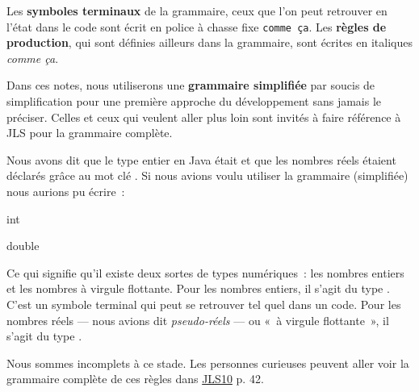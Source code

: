 Les \textbf{symboles terminaux} de la grammaire, ceux que l'on peut retrouver en
l'état dans le code sont écrit en police à chasse fixe \texttt{comme ça}. Les
\textbf{règles de production}, qui sont définies ailleurs dans la grammaire, sont
écrites en italiques \textit{comme ça}. 

Dans ces notes, nous utiliserons une \textbf{grammaire simplifiée} par soucis de
simplification pour une première approche du développement sans jamais le
préciser. Celles et ceux qui veulent aller plus loin sont invités  à faire
référence à JLS pour la grammaire complète.

Nous avons dit que le type entier en Java était  et que les nombres
réels étaient déclarés grâce au mot clé . Si nous avions voulu
utiliser la grammaire (simplifiée) nous aurions pu écrire~:

\begin{grammaire}
	
	    int
	
	    double
\end{grammaire}

Ce qui signifie qu'il existe deux sortes de types numériques~: les nombres
entiers et les nombres à virgule flottante. Pour les nombres entiers, il s'agit
du type . C'est un symbole terminal qui peut se retrouver tel quel dans
un code. Pour les nombres réels — nous avions dit \textit{pseudo-réels} — ou «~à
virgule flottante~», il s'agit du type .

Nous sommes incomplets à ce stade. Les personnes curieuses peuvent aller voir la grammaire complète de ces règles dans \href{https://docs.oracle.com/javase/specs/jls/se10/jls10.pdf}{JLS10} p. 42.

